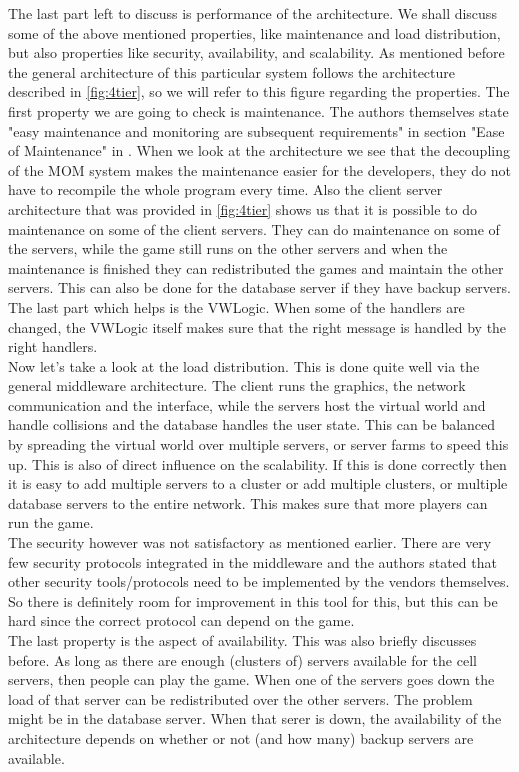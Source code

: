 The last part left to discuss is performance of the architecture. We shall discuss some of the above mentioned properties, like maintenance and load distribution, but also properties like security, availability, and scalability. As mentioned before the general architecture of this particular system follows the architecture described in \autoref{fig:4tier}, so we will refer to this figure regarding the properties. The first property we are going to check is maintenance. The authors themselves state "easy maintenance and monitoring are subsequent requirements" in section "Ease of Maintenance" in \cite{middleware}. When we look at the architecture we see that the decoupling of the MOM system makes the maintenance easier for the developers, they do not have to recompile the whole program every time. Also the client server architecture that was provided in \autoref{fig:4tier} shows us that it is possible to do maintenance on some of the client servers. They can do maintenance on some of the servers, while the game still runs on the other servers and when the maintenance is finished they can redistributed the games and maintain the other servers. This can also be done for the database server if they have backup servers. The last part which helps is the VWLogic. When some of the handlers are changed, the VWLogic itself makes sure that the right message is handled by the right handlers. \\
\indent Now let's take a look at the load distribution. This is done quite well via the general middleware architecture. The client runs the graphics, the network communication and the interface, while the servers host the virtual world and handle collisions and the database handles the user state. This can be balanced by spreading the virtual world over multiple servers, or server farms to speed this up. This is also of direct influence on the scalability. If this is done correctly then it is easy to add multiple servers to a cluster or add multiple clusters, or multiple database servers to the entire network. This makes sure that more players can run the game.\\
\indent The security however was not satisfactory as mentioned earlier. There are very few security protocols integrated in the middleware and the authors stated that other security tools/protocols need to be implemented by the vendors themselves. So there is definitely room for improvement in this tool for this, but this can be hard since the correct protocol can depend on the game.\\
\indent The last property is the aspect of availability. This was also briefly discusses before. As long as there are enough (clusters of) servers available for the cell servers, then people can play the game. When one of the servers goes down the load of that server can be redistributed over the other servers. The problem might be in the database server. When that serer is down, the availability of the architecture depends on whether or not (and how many) backup servers are available.


